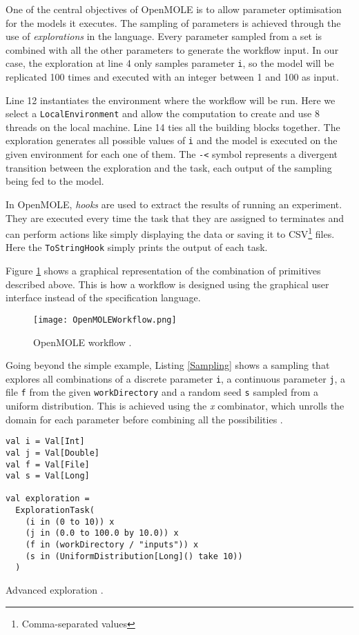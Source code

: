 One of the central objectives of OpenMOLE is to allow parameter optimisation for the models it executes. The sampling of parameters is achieved through the use of \textit{explorations} in the language. Every parameter sampled from a set is combined with all the other parameters to generate the workflow input. In our case, the exploration at line 4 only samples parameter \verb|i|, so the model will be replicated 100 times and executed with an integer between 1 and 100 as input.

Line 12 instantiates the environment where the workflow will be run. Here we select a \verb|LocalEnvironment| and allow the computation to create and use 8 threads on the local machine. Line 14 ties all the building blocks together. The exploration generates all possible values of \verb|i| and the model is executed on the given environment for each one of them. The \verb|-<| symbol represents a divergent transition between the exploration and the task, each output of the sampling being fed to the model.

In OpenMOLE, \textit{hooks} are used to extract the results of running an experiment. They are executed every time the task that they are assigned to terminates and can perform actions like simply displaying the data or saving it to CSV\footnote{Comma-separated values} files. Here the \verb|ToStringHook| simply prints the output of each task.

Figure \ref{OpenMOLEWorkflow} shows a graphical representation of the combination of primitives described above. This is how a workflow is designed using the graphical user interface instead of the specification language.

\begin{figure}[h]
	\centering
		\texttt{[image: OpenMOLEWorkflow.png]}
	\caption{OpenMOLE workflow \cite{OpenMOLE}.}
	\label{OpenMOLEWorkflow}
\end{figure}

Going beyond the simple example, Listing \ref{Sampling} shows a sampling that explores all combinations of a discrete parameter \verb|i|, a continuous parameter \verb|j|, a file \verb|f| from the given \verb|workDirectory| and a random seed \verb|s| sampled from a uniform distribution. This is achieved using the \textit{x} combinator, which unrolls the domain for each parameter before combining all the possibilities \cite{OpenMOLEDSL}.

\begin{listing}[h]
	\centering
	\begin{minipage}{10.6cm}
		\begin{verbatim}
val i = Val[Int]
val j = Val[Double]
val f = Val[File]
val s = Val[Long]

val exploration = 
  ExplorationTask(
	(i in (0 to 10)) x 
	(j in (0.0 to 100.0 by 10.0)) x
	(f in (workDirectory / "inputs")) x 
	(s in (UniformDistribution[Long]() take 10))
  )
		\end{verbatim}
	\end{minipage}
	\caption{Advanced exploration \cite{Leclaire2016}.}
	\label{Sampling}
\end{listing}

